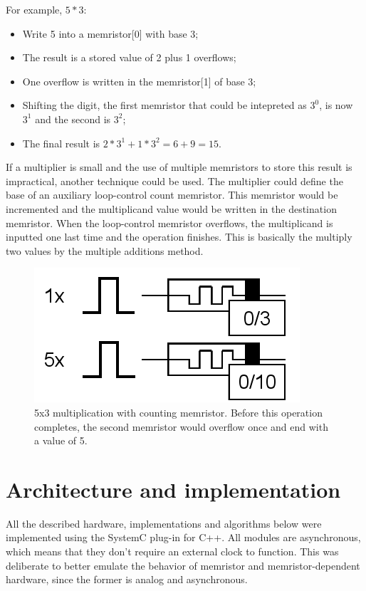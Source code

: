 \documentclass[ecp,tc,english]{iiufrgs}
\begin{document}
For example, $ 5 * 3 $:

\begin{itemize}
    \item Write 5 into a memristor[0] with base 3;
    \item The result is a stored value of 2 plus 1 overflows;
    \item One overflow is written in the memristor[1] of base 3;
    \item Shifting the digit, the first memristor that could be intepreted as $ 3^0 $, is now $ 3^1 $ and the second is $ 3^2 $;
    \item The final result is $ 2*3^1 + 1*3^2 = 6+9 = 15 $.
\end{itemize}

If a multiplier is small and the use of multiple memristors to store this result is impractical, another technique could be used. The multiplier could define the base of an auxiliary loop-control count memristor. This memristor would be incremented and the multiplicand value would be written in the destination memristor. When the loop-control memristor overflows, the multiplicand is inputted one last time and the operation finishes. This is basically the multiply two values by the multiple additions method.

\begin{figure}
  \caption{5x3 multiplication with counting memristor. Before this operation completes, the second memristor would overflow once and end with a value of 5.}
  \centerline{\includegraphics{fig/basicmul.png}}
  \label{fig:basicmul}
\end{figure}

\chapter{Architecture and implementation}

All the described hardware, implementations and algorithms below were implemented using the SystemC plug-in for C++. All modules are asynchronous, which means that they don't require an external clock to function. This was deliberate to better emulate the behavior of memristor and memristor-dependent hardware, since the former is analog and asynchronous.
\end{document}
